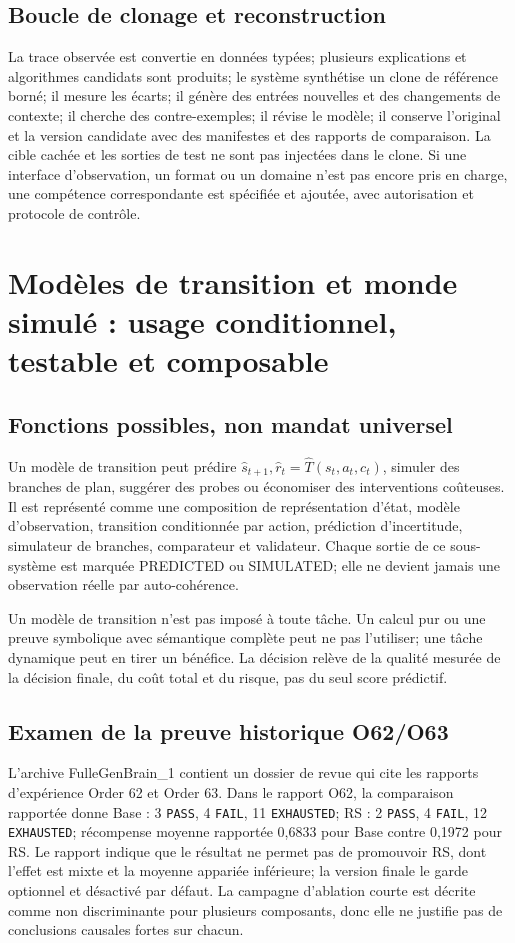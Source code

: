\documentclass[11pt,a4paper]{article}
\newcommand{\State}[1]{\textsf{#1}}
\begin{document}
\subsection{Boucle de clonage et reconstruction}
La trace observée est convertie en données typées; plusieurs explications et algorithmes candidats sont produits; le système synthétise un clone de référence borné; il mesure les écarts; il génère des entrées nouvelles et des changements de contexte; il cherche des contre-exemples; il révise le modèle; il conserve l'original et la version candidate avec des manifestes et des rapports de comparaison. La cible cachée et les sorties de test ne sont pas injectées dans le clone. Si une interface d'observation, un format ou un domaine n'est pas encore pris en charge, une compétence correspondante est spécifiée et ajoutée, avec autorisation et protocole de contrôle.

\section{Modèles de transition et monde simulé : usage conditionnel, testable et composable}
\subsection{Fonctions possibles, non mandat universel}
Un modèle de transition peut prédire \(\hat{s}_{t+1},\hat{r}_t=\hat{T}(s_t,a_t,c_t)\), simuler des branches de plan, suggérer des probes ou économiser des interventions coûteuses. Il est représenté comme une composition de représentation d'état, modèle d'observation, transition conditionnée par action, prédiction d'incertitude, simulateur de branches, comparateur et validateur. Chaque sortie de ce sous-système est marquée \State{PREDICTED} ou \State{SIMULATED}; elle ne devient jamais une observation réelle par auto-cohérence.

Un modèle de transition n'est pas imposé à toute tâche. Un calcul pur ou une preuve symbolique avec sémantique complète peut ne pas l'utiliser; une tâche dynamique peut en tirer un bénéfice. La décision relève de la qualité mesurée de la décision finale, du coût total et du risque, pas du seul score prédictif.

\subsection{Examen de la preuve historique O62/O63}
L'archive FulleGenBrain\_1 contient un dossier de revue qui cite les rapports d'expérience Order 62 et Order 63. Dans le rapport O62, la comparaison rapportée donne Base : 3 \texttt{PASS}, 4 \texttt{FAIL}, 11 \texttt{EXHAUSTED}; RS : 2 \texttt{PASS}, 4 \texttt{FAIL}, 12 \texttt{EXHAUSTED}; récompense moyenne rapportée 0,6833 pour Base contre 0,1972 pour RS. Le rapport indique que le résultat ne permet pas de promouvoir RS, dont l'effet est mixte et la moyenne appariée inférieure; la version finale le garde optionnel et désactivé par défaut. La campagne d'ablation courte est décrite comme non discriminante pour plusieurs composants, donc elle ne justifie pas de conclusions causales fortes sur chacun.
\end{document}
